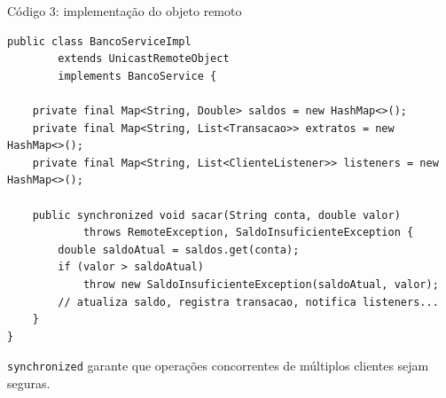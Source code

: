 \documentclass[aspectratio=169]{beamer}
\newcommand{\code}[1]{\texttt{#1}}
\begin{document}
\begin{frame}[fragile]{Código 3: implementação do objeto remoto}
\begin{lstlisting}
public class BancoServiceImpl
        extends UnicastRemoteObject
        implements BancoService {

    private final Map<String, Double> saldos = new HashMap<>();
    private final Map<String, List<Transacao>> extratos = new HashMap<>();
    private final Map<String, List<ClienteListener>> listeners = new HashMap<>();

    public synchronized void sacar(String conta, double valor)
            throws RemoteException, SaldoInsuficienteException {
        double saldoAtual = saldos.get(conta);
        if (valor > saldoAtual)
            throw new SaldoInsuficienteException(saldoAtual, valor);
        // atualiza saldo, registra transacao, notifica listeners...
    }
}
\end{lstlisting}

\vspace{0.1cm}
\small \code{synchronized} garante que operações concorrentes de múltiplos clientes sejam seguras.
\end{frame}
\end{document}
